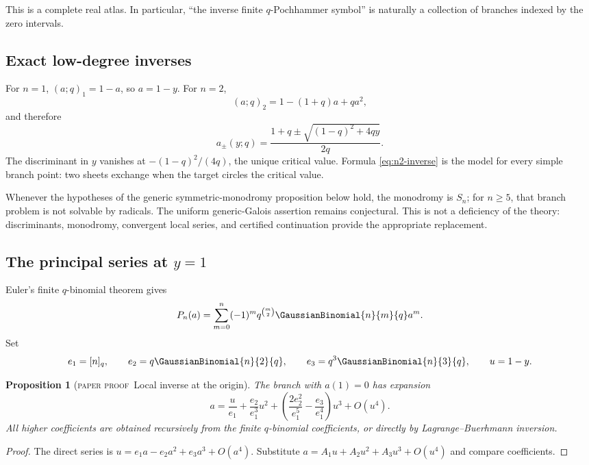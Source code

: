 \documentclass[11pt,oneside]{article}
\newtheorem{proposition}[theorem]{Proposition}
\theoremstyle{definition}
\theoremstyle{remark}
\theoremstyle{plain}
\theoremstyle{definition}
\theoremstyle{remark}
\newcommand{\statusproved}{\textcolor{provedgreen}{\textsc{paper proof}}}
\numberwithin{equation}{section}
\numberwithin{figure}{section}
\numberwithin{table}{section}
\let\reportsubsection\subsection
\let\reportsubsubsection\subsubsection
\let\section\reportsubsection
\let\subsection\reportsubsubsection
\begin{document}
This is a complete real atlas.  In particular, ``the inverse finite
\(q\)-Pochhammer symbol'' is naturally a collection of branches indexed by the
zero intervals.

\section{Exact low-degree inverses}
For \(n=1\), \((a;q)_1=1-a\), so \(a=1-y\).  For \(n=2\),
\[
 (a;q)_2=1-(1+q)a+qa^2,
\]
and therefore
\begin{equation}
 a_{\pm}(y;q)=
 \frac{1+q\pm\sqrt{(1-q)^2+4qy}}{2q}.
 \label{eq:n2-inverse}
\end{equation}
The discriminant in \(y\) vanishes at
\(- (1-q)^2/(4q)\), the unique critical value.  Formula
\eqref{eq:n2-inverse} is the model for every simple branch point: two sheets
exchange when the target circles the critical value.

Whenever the hypotheses of the generic symmetric-monodromy proposition below
hold, the monodromy is \(S_n\); for \(n\ge5\), that branch problem is not
solvable by radicals.  The uniform generic-Galois assertion remains
conjectural.  This is not a deficiency of the theory: discriminants, monodromy,
convergent local series, and certified continuation provide the appropriate
replacement.

\section{The principal series at \texorpdfstring{\(y=1\)}{y=1}}
Euler's finite \(q\)-binomial theorem gives
\[
 P_n(a)=\sum_{m=0}^n(-1)^m q^{\binom m2}\GaussianBinomial{n}{m}{q} a^m.
\]
Set
\[
 e_1=[n]_q,
 \qquad e_2=q\GaussianBinomial{n}{2}{q},
 \qquad e_3=q^3\GaussianBinomial{n}{3}{q},
 \qquad u=1-y.
\]

\begin{proposition}[\statusproved\ Local inverse at the origin]
The branch with \(a(1)=0\) has expansion
\begin{equation}
 a=\frac{u}{e_1}
 +\frac{e_2}{e_1^3}u^2
 +\left(\frac{2e_2^2}{e_1^5}-\frac{e_3}{e_1^4}\right)u^3
 +O(u^4).
 \label{eq:finite-principal-series}
\end{equation}
All higher coefficients are obtained recursively from the finite
\(q\)-binomial coefficients, or directly by Lagrange--Buerhmann inversion.
\end{proposition}
\begin{proof}
The direct series is
\(u=e_1a-e_2a^2+e_3a^3+O(a^4)\).  Substitute
\(a=A_1u+A_2u^2+A_3u^3+O(u^4)\) and compare coefficients.
\end{proof}
\end{document}
